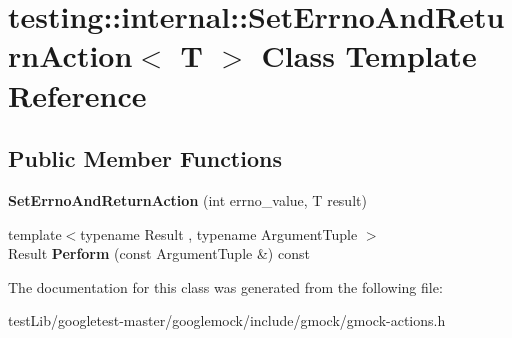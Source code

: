 \hypertarget{classtesting_1_1internal_1_1SetErrnoAndReturnAction}{}\section{testing\+:\+:internal\+:\+:Set\+Errno\+And\+Return\+Action$<$ T $>$ Class Template Reference}
\label{classtesting_1_1internal_1_1SetErrnoAndReturnAction}
\subsection*{Public Member Functions}
\begin{DoxyCompactItemize}
\item 
\mbox{\label{classtesting_1_1internal_1_1SetErrnoAndReturnAction_abfe5a194a9b8f2b303c635ad99b3a257}} 
{\bfseries Set\+Errno\+And\+Return\+Action} (int errno\+\_\+value, T result)
\item 
\mbox{\label{classtesting_1_1internal_1_1SetErrnoAndReturnAction_a44025d0d124cab72878bf6bdb12c3693}} 
{\footnotesize template$<$typename Result , typename Argument\+Tuple $>$ }\\Result {\bfseries Perform} (const Argument\+Tuple \&) const
\end{DoxyCompactItemize}


The documentation for this class was generated from the following file\+:\begin{DoxyCompactItemize}
\item 
test\+Lib/googletest-\/master/googlemock/include/gmock/gmock-\/actions.\+h\end{DoxyCompactItemize}
